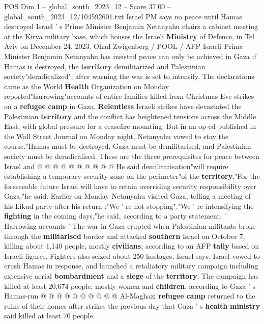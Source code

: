 \begin{textsample}{POS Dim 1 – global\_south\_2023\_12 – Score 37.00 – global\_south\_2023\_12/104592601.txt}  \label{ex:f1_pos_035}
Israel PM says no peace until Hamas destroyed Israel ' s Prime Minister Benjamin Netanyahu chairs a cabinet meeting at the Kirya military base, which houses the Israeli \textbf{Ministry} of Defence, in Tel Aviv on December 24, 2023.
Ohad Zwigenberg / POOL / AFP Israeli Prime Minister Benjamin Netanyahu has insisted peace can only be achieved in Gaza if Hamas is destroyed, the \textbf{territory} demilitarized and Palestinian society"deradicalized", after warning the war is set to intensify.
The declarations came as the World \textbf{Health} Organization on Monday reported"harrowing"accounts of entire families killed from Christmas Eve strikes on a \textbf{refugee} \textbf{camp} in Gaza. \textbf{Relentless} Israeli strikes have devastated the Palestinian \textbf{territory} and the conflict has heightened tensions across the Middle East, with global pressure for a ceasefire mounting.
But in an op-ed published in the Wall Street Journal on Monday night, Netanyahu vowed to stay the course."Hamas must be destroyed, Gaza must be demilitarised, and Palestinian society must be deradicalised.
These are the three prerequisites for peace between Israel and @ @ @ @ @ @ @ @ @ @ He said demilitarisation"will require establishing a temporary security zone on the perimeter"of the \textbf{territory}."For the foreseeable future Israel will have to retain overriding security responsibility over Gaza,"he said.
Earlier on Monday Netanyahu visited Gaza, telling a meeting of his Likud party after his return :"We ' re not stopping"."We ' re intensifying the \textbf{fighting} in the coming days,"he said, according to a party statement. ' Harrowing accounts ' The war in Gaza erupted when Palestinian militants broke through the \textbf{militarised} border and attacked \textbf{southern} Israel on October 7, killing about 1,140 people, mostly \textbf{civilians}, according to an AFP \textbf{tally} based on Israeli figures.
Fighters also seized about 250 hostages, Israel says.
Israel vowed to crush Hamas in response, and launched a retaliatory military campaign including extensive aerial \textbf{bombardment} and a \textbf{siege} of the \textbf{territory}.
The campaign has killed at least 20,674 people, mostly women and \textbf{children}, according to Gaza ' s Hamas-run @ @ @ @ @ @ @ @ @ @ Al-Maghazi \textbf{refugee} \textbf{camp} returned to the ruins of their homes after strikes the previous day that Gaza ' s \textbf{health} \textbf{ministry} said killed at least 70 people.

\end{textsample}
